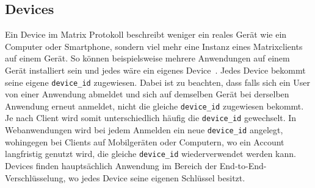     \subsection{Devices}
    Ein Device im Matrix Protokoll beschreibt weniger ein reales Gerät wie ein Computer oder Smartphone, sondern viel mehr eine Instanz eines Matrixclients auf einem Gerät.
    So können beispielsweise mehrere Anwendungen auf einem Gerät installiert sein und jedes wäre ein eigenes Device~\cite{devices}.
    Jedes Device bekommt seine eigene \texttt{device\_id} zugewiesen.
    Dabei ist zu beachten, dass falls sich ein User von einer Anwendung abmeldet und sich auf demselben Gerät bei derselben Anwendung erneut anmeldet, nicht die gleiche \texttt{device\_id} zugewiesen bekommt.
    Je nach Client wird somit unterschiedlich häufig die \texttt{device\_id} gewechselt.
    In Webanwendungen wird bei jedem Anmelden ein neue \texttt{device\_id} angelegt, wohingegen bei Clients auf Mobilgeräten oder Computern, wo ein Account langfristig genutzt wird, die gleiche \texttt{device\_id} wiederverwendet werden kann.
    Devices finden hauptsächlich Anwendung im Bereich der End-to-End-Verschlüsselung, wo jedes Device seine eigenen Schlüssel besitzt.

    \newpage
